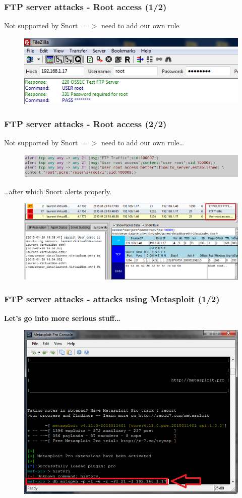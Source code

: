 \documentclass{beamer}
\begin{document}
\begin{frame}
\frametitle{FTP server attacks - Root access (1/2)}
Not supported by Snort $=>$ need to add our own rule
\begin{figure}
   \includegraphics[width= 0.7\linewidth]{../images/VM_FTP_3.png}
\end{figure}
\end{frame}
\begin{frame}
\frametitle{FTP server attacks - Root access (2/2)}
Not supported by Snort $=>$ need to add our own rule\ldots
\begin{figure}
   \includegraphics[width= 1\linewidth]{../images/VM_FTP_2.png}
\end{figure}
\ldots after which Snort alerts properly.
\begin{figure}
   \includegraphics[width= 1\linewidth]{../images/VM_FTP_4.png}
\end{figure}
\end{frame}
\begin{frame}
\frametitle{FTP server attacks - attacks using Metasploit (1/2)}
\textbf{Let's go into more serious stuff\ldots}
\begin{figure}
   \includegraphics[width= 0.7\linewidth]{../images/VM_FTP_8.png}
\end{figure}
\end{frame}
\end{document}
